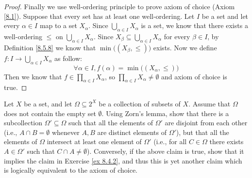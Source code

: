 \begin{proof}
    Finally we use well-ordering principle to prove axiom of choice (Axiom \ref{8.1}).
    Suppose that every set has at least one well-ordering.
    Let \(I\) be a set and let every \(\alpha \in I\) map to a set \(X_{\alpha}\).
    Since \(\bigcup_{\alpha \in I} X_{\alpha}\) is a set, we know that there exists a well-ordering \(\leq\) on \(\bigcup_{\alpha \in I} X_{\alpha}\).
    Since \(X_{\beta} \subseteq \bigcup_{\alpha \in I} X_{\alpha}\) for every \(\beta \in I\), by Definition \ref{8.5.8} we know that \(\min\big((X_{\beta}, \leq)\big)\) exists.
    Now we define \(f : I \to \bigcup_{\alpha \in I} X_{\alpha}\) as follow:
    \[
        \forall \alpha \in I, f(\alpha) = \min\big((X_{\alpha}, \leq)\big)
    \]
    Then we know that \(f \in \prod_{\alpha \in I} X_{\alpha}\), so \(\prod_{\alpha \in I} X_{\alpha} \neq \emptyset\) and axiom of choice is true.
\end{proof}

\begin{exercise}\label{ex 8.5.20}
    Let \(X\) be a set, and let \(\Omega \subseteq 2^X\) be a collection of subsets of \(X\).
    Assume that \(\Omega\) does not contain the empty set \(\emptyset\).
    Using Zorn's lemma, show that there is a subcollection \(\Omega' \subseteq \Omega\) such that all the elements of \(\Omega'\) are disjoint from each other (i.e., \(A \cap B = \emptyset\) whenever \(A, B\) are distinct elements of \(\Omega'\)), but that all the elements of \(\Omega\) intersect at least one element of \(\Omega'\) (i.e., for all \(C \in \Omega\) there exists \(A \in \Omega'\) such that \(C \cap A \neq \emptyset\)).
    Conversely, if the above claim is true, show that it implies the claim in Exercise \ref{ex 8.4.2}, and thus this is yet another claim which is logically equivalent to the axiom of choice.
\end{exercise}

